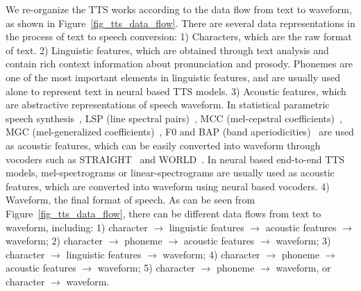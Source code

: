 \documentclass{article}
\begin{document}
We re-organize the TTS works according to the data flow from text to waveform, as shown in Figure~\ref{fig_tts_data_flow}. There are several data representations in the process of text to speech conversion: 1) Characters, which are the raw format of text. 2) Linguistic features, which are obtained through text analysis and contain rich context information about pronunciation and prosody. Phonemes are one of the most important elements in linguistic features, and are usually used alone to represent text in neural based TTS models. 3) Acoustic features, which are abstractive representations of speech waveform. In statistical parametric speech synthesis~\cite{yoshimura1999simultaneous,tokuda2000speech,yoshimura2002simultaneous,zen2009statistical,tokuda2013speech}, LSP (line spectral pairs)~\cite{itakura1975line}, MCC (mel-cepstral coefficients)~\cite{fukada1992adaptive}, MGC (mel-generalized coefficients)~\cite{tokuda1994mel}, F0 and BAP (band aperiodicities)~\cite{kawahara1999restructuring,kawahara2001aperiodicity} are used as acoustic features, which can be easily converted into waveform through vocoders such as STRAIGHT~\cite{kawahara2006straight} and WORLD~\cite{morise2016world}. In neural based end-to-end TTS models, mel-spectrograms or linear-spectrograms are usually used as acoustic features, which are converted into waveform using neural based vocoders. 4) Waveform, the final format of speech. As can be seen from Figure~\ref{fig_tts_data_flow}, there can be different data flows from text to waveform, including: 1) character $\rightarrow$ linguistic features $\rightarrow$ acoustic features $\rightarrow$ waveform; 2) character $\rightarrow$ phoneme $\rightarrow$ acoustic features $\rightarrow$ waveform; 3) character $\rightarrow$ linguistic features $\rightarrow$ waveform; 4) character $\rightarrow$ phoneme $\rightarrow$ acoustic features $\rightarrow$ waveform; 5) character $\rightarrow$ phoneme $\rightarrow$ waveform, or character $\rightarrow$ waveform.





\end{document}
